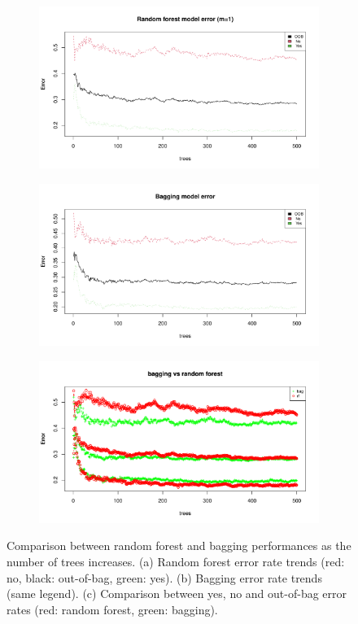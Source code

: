 \begin{figure}[h]
	\centering
	\hfill
	\begin{subfigure}{.5\textwidth}
		\centering
		\includegraphics[width=0.7\linewidth]{ImageFiles/Classification/Trees/best_for_500_plot.pdf}
		\caption{}
		\label{fig:best_for_500_plot}
	\end{subfigure}%
	\hfill
	\begin{subfigure}{.5\textwidth}
		\centering
		\includegraphics[width=0.7\linewidth]{ImageFiles/Classification/Trees/bagg_500_plot.pdf}
		\caption{}
		\label{fig:bagg_500_plot}
	\end{subfigure}
	\begin{subfigure}{.5\textwidth}
		\centering
		\includegraphics[width=0.7\linewidth]{ImageFiles/Classification/Trees/vs_bagg_for_500_plot.pdf}
		\caption{}
		\label{fig:vs_bagg_for_500_plot}
	\end{subfigure}
	\caption{Comparison between random forest and bagging performances as the number of trees increases. (a) Random forest error rate trends (red: no, black: out-of-bag, green: yes). (b) Bagging error rate trends (same legend). (c) Comparison between yes, no and out-of-bag error rates (red: random forest, green: bagging).}
	\label{fig:RFvsB}
\end{figure}

